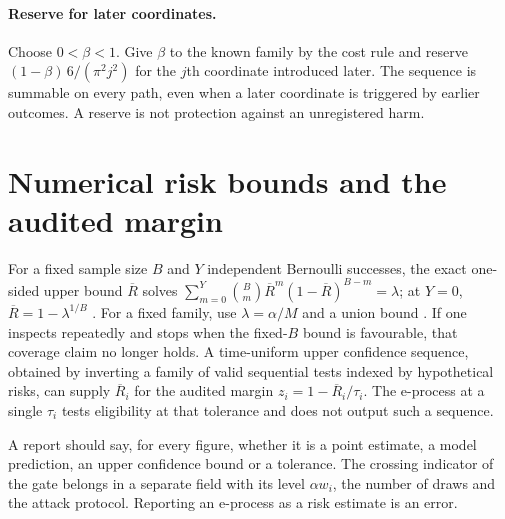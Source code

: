 \documentclass{jpc}
\begin{document}
\paragraph{Reserve for later coordinates.} Choose $0<\beta<1$. Give $\beta$ to the known family by the cost rule and reserve $(1-\beta)\,6/(\pi^2j^2)$ for the $j$th coordinate introduced later. The sequence is summable on every path, even when a later coordinate is triggered by earlier outcomes. A reserve is not protection against an unregistered harm.

\section{Numerical risk bounds and the audited margin}\label{sec:s-bounds}
For a fixed sample size $B$ and $Y$ independent Bernoulli successes, the exact one-sided upper bound $\overline{R}$ solves $\sum_{m=0}^{Y}\binom Bm \overline{R}^m(1-\overline{R})^{B-m}=\lambda$; at $Y=0$, $\overline{R}=1-\lambda^{1/B}$ \cite{clopper1934}. For a fixed family, use $\lambda=\alpha/M$ and a union bound \cite{dunn1961}. If one inspects repeatedly and stops when the fixed-$B$ bound is favourable, that coverage claim no longer holds. A time-uniform upper confidence sequence, obtained by inverting a family of valid sequential tests indexed by hypothetical risks, can supply $\overline{R}_i$ for the audited margin \cite{darling1967,lai1976,howard2020,howard2021,waudby2024} $z_i=1-\overline{R}_i/\tau_i$. The e-process at a single $\tau_i$ tests eligibility at that tolerance and does not output such a sequence.

A report should say, for every figure, whether it is a point estimate, a model prediction, an upper confidence bound or a tolerance. The crossing indicator of the gate belongs in a separate field with its level $\alpha w_i$, the number of draws and the attack protocol. Reporting an e-process as a risk estimate is an error.
\end{document}
